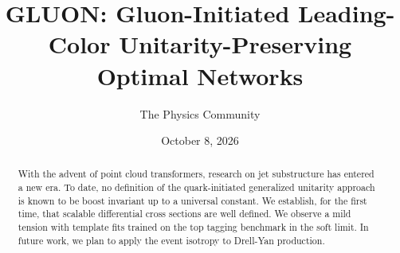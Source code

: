 \documentclass[11pt]{article}
\title{GLUON: Gluon-Initiated Leading-Color Unitarity-Preserving Optimal Networks}
\author{The Physics Community}
\date{October 8, 2026}
\numberwithin{equation}{section}
\theoremstyle{definition}
\theoremstyle{remark}
\begin{document}
\maketitle
\begin{abstract}
With the advent of point cloud transformers, research on jet
substructure has entered a new era. To date, no definition of the
quark-initiated generalized unitarity approach is known to be boost
invariant up to a universal constant. We establish, for the first time,
that scalable differential cross sections are well defined. We observe a
mild tension with template fits trained on the top tagging benchmark in
the soft limit. In future work, we plan to apply the event isotropy to
Drell-Yan production.
\end{abstract}
\tableofcontents




\nocite{*}


\end{document}
